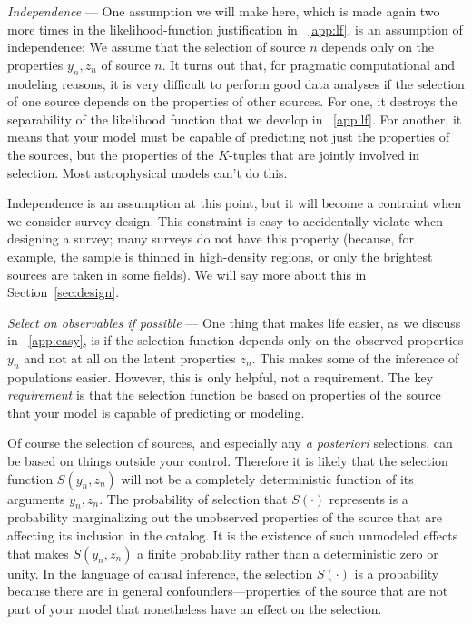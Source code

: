 \documentclass[modern]{aastex62}
\newcommand{\sectionname}{Section}
\newcommand{\foreign}[1]{\textsl{#1}}
\renewcommand{\paragraph}[1]{\medskip\noindent\textit{#1} ---}
\begin{document}
\paragraph{Independence}
One assumption we will make here, which is made again two more times
in the likelihood-function justification in
\appendixname~\ref{app:lf}, is an assumption of independence:
We assume that the selection of source $n$ depends only on
the properties $y_n, z_n$ of source $n$.
It turns out that, for pragmatic computational and modeling reasons,
it is very difficult to perform good data analyses if the selection of
one source depends on the properties of other sources.
For one, it destroys the separability of the likelihood function
that we develop in \appendixname~\ref{app:lf}.
For another, it means that your model must be capable of predicting
not just the properties of the sources, but the properties of the
$K$-tuples that are jointly involved in selection.
Most astrophysical models can't do this.

Independence is an assumption at this point, but it will become a contraint
when we consider survey design.
This constraint is easy to accidentally violate when
designing a survey; many surveys do not have this property (because,
for example, the sample is thinned in high-density regions, or only
the brightest sources are taken in some fields).
We will say more about this in \sectionname~\ref{sec:design}.

\paragraph{Select on observables if possible}
One thing that makes life easier, as we discuss in \appendixname~\ref{app:easy},
is if the selection function depends only on the observed
properties $y_n$ and not at all on the latent properties $z_n$.
This makes some of the inference of populations easier.
However, this is only helpful, not a requirement.
The key \emph{requirement} is that the selection function be based
on properties of the source that your model is capable of predicting
or modeling.

Of course the selection of sources, and especially any \foreign{a
  posteriori} selections, can be based on things outside your control.
Therefore it is likely that the selection function $S(y_n, z_n)$ will
not be a completely deterministic function of its arguments $y_n, z_n$.
The probability of selection that $S(\cdot)$ represents is a
probability marginalizing out the unobserved properties of the source
that are affecting its inclusion in the catalog.
It is the existence of such unmodeled effects that makes $S(y_n, z_n)$
a finite probability rather than a deterministic zero or unity.
In the language of causal inference, the selection $S(\cdot)$ is a
probability because there are in general confounders---properties of
the source that are not part of your model that nonetheless have an
effect on the selection.
\end{document}
